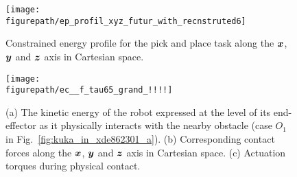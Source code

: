 \begin{figure}[!htbp]
\centering
{\texttt{[image: \\figurepath/ep\_profil\_xyz\_futur\_with\_recnstruted6]}}
\caption{Constrained energy profile for the pick and place task along the $\mbox{\boldmath${x}$}$, $\mbox{\boldmath${y}$}$ and $\mbox{\boldmath${z}$}$ axis in Cartesian space.} 
\label{fig:ep_profil_xyz_futur_with_recnstruted6}
\end{figure}
\begin{figure}[!htbp]
\centering
{\texttt{[image: \\figurepath/ec\_\_f\_tau65\_grand\_!!!!]}}
\caption{(a) The kinetic energy of the robot expressed at the level of its end-effector as it physically interacts with the nearby obstacle (case $O_1$ in Fig.~\ref{fig:kuka_in_xde862301_a}). (b) Corresponding contact forces along the $\mbox{\boldmath${x}$}$, $\mbox{\boldmath${y}$}$ and $\mbox{\boldmath${z}$}$ axis in Cartesian space. (c) Actuation torques during physical contact.} 
\label{fig:ec__f_tau65_grand_!!!!}
\end{figure}
%
